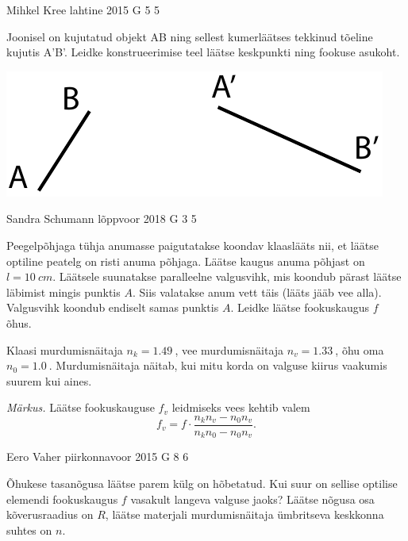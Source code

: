 \documentclass[11pt]{article}
\begin{document}
{%
{Mihkel Kree} %
{lahtine} %
{2015} %
{G 5} %
{5} %
{
\ifStatement
Joonisel on kujutatud objekt AB ning sellest kumerläätses tekkinud tõeline kujutis A'B'. Leidke konstrueerimise teel läätse keskpunkti ning fookuse asukoht.

\begin{center}
 \includegraphics[width=0.7\linewidth]{2015-lahg-05-laatsMihkel.pdf}
\end{center}
\fi
}

{Sandra Schumann} %
{lõppvoor} %
{2018} %
{G 3} %
{5} %
{
\ifStatement
Peegelpõhjaga tühja anumasse paigutatakse koondav klaaslääts nii, et läätse optiline peatelg on risti anuma põhjaga. Läätse kaugus anuma põhjast on $l=\SI{10}{cm}$. Läätsele suunatakse paralleelne valgusvihk, mis koondub pärast läätse läbimist mingis punktis $A$. Siis valatakse anum vett täis (lääts jääb vee alla). Valgusvihk koondub endiselt samas punktis $A$. Leidke läätse fookuskaugus $f$ õhus.

Klaasi murdumisnäitaja $n_k = \SI{1,49}{}$, vee murdumisnäitaja $n_v = \SI{1,33}{}$, õhu oma $n_0 = \SI{1,0}{}$. Murdumisnäitaja näitab, kui mitu korda on valguse kiirus vaakumis suurem kui aines.

\emph{Märkus.} Läätse fookuskauguse $f_v$ leidmiseks vees kehtib valem 
\[ f_v = f\cdot\frac{n_k n_v - n_0 n_v}{n_k n_0 - n_0 n_v}. \]
\fi
}
\newpage


{Eero Vaher} %
{piirkonnavoor} %
{2015} %
{G 8} %
{6} %
{
\ifStatement
Õhukese tasanõgusa läätse parem külg on hõbetatud. Kui suur on sellise optilise elemendi fookuskaugus $f$ vasakult langeva valguse jaoks? Läätse nõgusa osa kõverusraadius on $R$, läätse materjali murdumisnäitaja ümbritseva keskkonna suhtes on $n$.

}}
\end{document}
